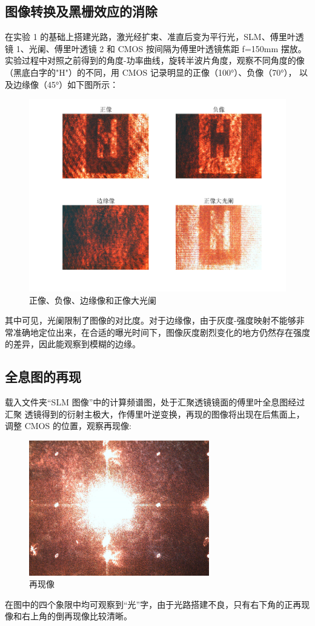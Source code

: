 \documentclass[11pt,a4paper]{article}
\begin{document}
\subsection{图像转换及黑栅效应的消除}
在实验 1 的基础上搭建光路，激光经扩束、准直后变为平行光，SLM、傅里叶透镜
1、光阑、傅里叶透镜 2 和 CMOS 按间隔为傅里叶透镜焦距 f=150mm 摆放。
实验过程中对照之前得到的角度-功率曲线，旋转半波片角度，观察不同角度的像（黑底白字的"H"）的不同，用 CMOS 记录明显的正像（100°）、负像（70°），
以及边缘像（45°）如下图所示：
\begin{figure}[H]
    \centering
    \includegraphics[width=\textwidth]{图像排列.png}
    \caption{正像、负像、边缘像和正像大光阑}
    \label{fig:image-arrangement}
    \end{figure}
其中可见，光阑限制了图像的对比度。对于边缘像，由于灰度-强度映射不能够非常准确地定位出来，在合适的曝光时间下，图像灰度剧烈变化的地方仍然存在强度的差异，因此能观察到模糊的边缘。

\subsection{全息图的再现}
载入文件夹“SLM 图像”中的计算频谱图，处于汇聚透镜镜面的傅里叶全息图经过汇聚
透镜得到的衍射主极大，作傅里叶逆变换，再现的图像将出现在后焦面上，调整 CMOS 的位置，观察再现像:
\begin{figure}[H]
    \centering
    \includegraphics[width=0.7\textwidth]{再现像.jpg}
    \caption{再现像}
    \label{fig:reproduced-image}
    \end{figure}
在图中的四个象限中均可观察到“光”字，由于光路搭建不良，只有右下角的正再现像和右上角的倒再现像比较清晰。
\end{document}
